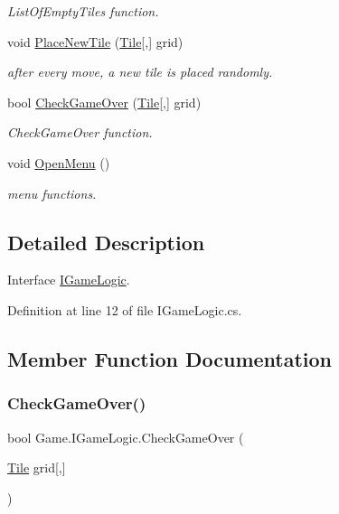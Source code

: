 \begin{DoxyCompactItemize}
\begin{DoxyCompactList}\small\item\em List\+Of\+Empty\+Tiles function. \end{DoxyCompactList}\item 
void \mbox{\hyperlink{interface_game_1_1_i_game_logic_af4c46a6bc7485d51c95c3eaad66daddf}{Place\+New\+Tile}} (\mbox{\hyperlink{class_game_1_1_tile}{Tile}}\mbox{[},\mbox{]} grid)
\begin{DoxyCompactList}\small\item\em after every move, a new tile is placed randomly. \end{DoxyCompactList}\item 
bool \mbox{\hyperlink{interface_game_1_1_i_game_logic_adad0be2f1112c86b5a0fcaf9862e5947}{Check\+Game\+Over}} (\mbox{\hyperlink{class_game_1_1_tile}{Tile}}\mbox{[},\mbox{]} grid)
\begin{DoxyCompactList}\small\item\em Check\+Game\+Over function. \end{DoxyCompactList}\item 
void \mbox{\hyperlink{interface_game_1_1_i_game_logic_a87f5edc4698d50e56c64e3b822ed7ab7}{Open\+Menu}} ()
\begin{DoxyCompactList}\small\item\em menu functions. \end{DoxyCompactList}\end{DoxyCompactItemize}


\subsection{Detailed Description}
Interface \mbox{\hyperlink{interface_game_1_1_i_game_logic}{I\+Game\+Logic}}. 



Definition at line 12 of file I\+Game\+Logic.\+cs.



\subsection{Member Function Documentation}
\mbox{\label{interface_game_1_1_i_game_logic_adad0be2f1112c86b5a0fcaf9862e5947}} 
\subsubsection{\texorpdfstring{CheckGameOver()}{CheckGameOver()}}
{\footnotesize\ttfamily bool Game.\+I\+Game\+Logic.\+Check\+Game\+Over (\begin{DoxyParamCaption}\item[{\mbox{\hyperlink{class_game_1_1_tile}{Tile}}}]{grid\mbox{[},\mbox{]} }\end{DoxyParamCaption})}



